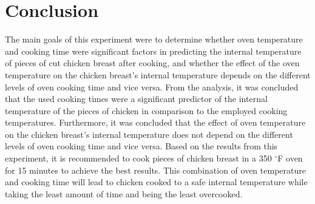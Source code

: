 \documentclass[a4paper]{article}
\begin{document}
\section{Conclusion} \label{Conclusion}
\hspace{1cm}The main goals of this experiment were to determine whether oven temperature and cooking time were significant factors in predicting the internal temperature of pieces of cut chicken breast after cooking, and whether the effect of the oven temperature on the chicken breast's internal temperature depends on the different levels of oven cooking time and vice versa. From the analysis, it was concluded that the used cooking times were a significant predictor of the internal temperature of the pieces of chicken in comparison to the employed cooking temperatures. Furthermore, it was concluded that the effect of oven temperature on the chicken breast’s internal temperature does not depend on the different levels of oven cooking time and vice versa. Based on the results from this experiment, it is recommended to cook pieces of chicken breast in a 350 $^\circ$F oven for 15 minutes to achieve the best results. This combination of oven temperature and cooking time will lead to chicken cooked to a safe internal temperature while taking the least amount of time and being the least overcooked.
\newpage
\end{document}
